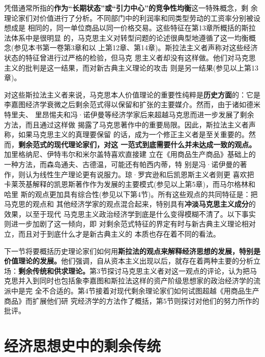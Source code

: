 凭借通常所指的\textbf{作为“长期状态”或“引力中心”的竞争性均衡}这一特殊概念，剩
余理论家们对价值进行了分析。不同部门中的利润率和同类型劳动的工资率分别被设想成是
相同的，同一单位商品以同一价格交易。这些特征在第13章所概括的斯拉法体系中是很明显
的，马克思主义对转型问题的论述很典型地遵循了这一均衡概念(参见本书第一卷第3章和以
上第12章、第14章)。斯拉法主义者声称对这些经济状态的特征曾进行过严格的检验，但马克
思主义者却没有这样做。他们对马克思主义的批判是这一结果，而对新古典主义理论的攻击
则是另一结果(参见以上第13章)。

对这些斯拉法主义者来说，马克思本人价值理论的重要性纯粹是\textbf{历史方面}的：它是
李嘉图经济学衰微之后剩余范式得以保留和扩张的主要媒介。然而，由于诸如德米特里夫、
里昂惕夫和冯·诺伊曼等经济学家后来超越马克思而进一步发展了剩余方法，而且通过这样做
揭露了马克思著作中的重要局限。因此，斯拉法主义者声称，如果马克思主义的真理要保留
的话，成为一个修正主义者是至关重要的。然而，\textbf{剩余范式的现代理论家们，对这
  一范式到底需要什么并未达成一致的观点。}加里格纳尼、伊特韦尔和米尔盖特喜欢直接建
立在《用商品生产商品》基础上的一种方法，而森岛通夫、古德温，可能还有帕西内蒂，特
别是冯·诺伊曼的著作，则认为线性生产理论更有说服力。琼·罗宾逊和后凯恩斯主义者则更
喜欢把卡莱茨基解释的凯恩斯著作作为发展的主要模式(参见以上第5章)，而马尔格林和哈里
斯的观点更加具有综合性(参见以下第4节)。所有这些观点的共同特征是：把马克思的观点和
其他经济学家的观点混合起来，特别具有\textbf{冲淡马克思主义成分}的效果，以至于现代
马克思主义政治经济学到底是什么变得模糊不清了。以下事实则进一步加剧了这一倾向，即
对剩余范式特征的界定有时与新古典主义理论相对立，而且对于到底什么才是新古典主义的
本质也存在着不同的看法。

下一节将要概括历史理论家们如何用\textbf{斯拉法的观点来解释经济思想的发展，特别是
  价值理论的发展。}他们强调，自从资本主义出现以后，就存在着两种主要的分析立
场：\textbf{剩余传统和供求理论。}第3节探讨马克思主义者对这一观点的评论，认为把马
克思并入到同时也包括象李嘉图和斯拉法这样的资产阶级思想家的政治经济学的流派中是完
全不合适的。第4节接着对现代剩余理论家们如何试图超越《用商品生产商品》而扩展他们研
究经济学的方法作了概括，第5节则探讨对他们的努力所作的批评。

\section{经济思想史中的剩余传统}

